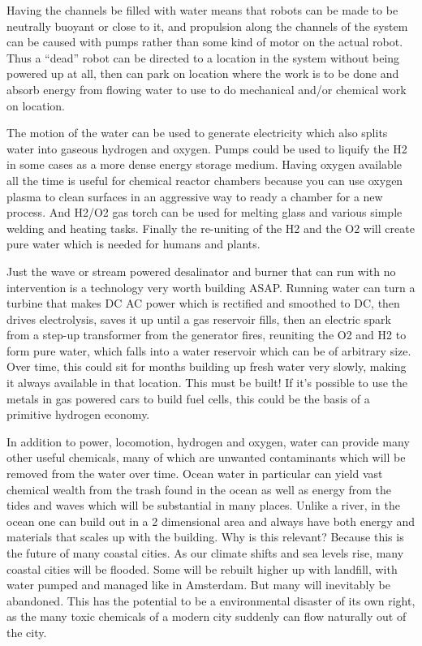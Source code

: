 Having the channels be filled with water means that robots can be made
to be neutrally buoyant or close to it, and propulsion along the
channels of the system can be caused with pumps rather than some kind of
motor on the actual robot. Thus a ``dead'' robot can be directed to a
location in the system without being powered up at all, then can park on
location where the work is to be done and absorb energy from flowing
water to use to do mechanical and/or chemical work on location.

The motion of the water can be used to generate electricity which also
splits water into gaseous hydrogen and oxygen. Pumps could be used to
liquify the H2 in some cases as a more dense energy storage medium.
Having oxygen available all the time is useful for chemical reactor
chambers because you can use oxygen plasma to clean surfaces in an
aggressive way to ready a chamber for a new process. And H2/O2 gas torch
can be used for melting glass and various simple welding and heating
tasks. Finally the re-uniting of the H2 and the O2 will create pure
water which is needed for humans and plants.

Just the wave or stream powered desalinator and burner that can run with
no intervention is a technology very worth building ASAP. Running water
can turn a turbine that makes DC AC power which is rectified and
smoothed to DC, then drives electrolysis, saves it up until a gas
reservoir fills, then an electric spark from a step-up transformer from
the generator fires, reuniting the O2 and H2 to form pure water, which
falls into a water reservoir which can be of arbitrary size. Over time,
this could sit for months building up fresh water very slowly, making it
always available in that location. This must be built! If it's possible
to use the metals in gas powered cars to build fuel cells, this could be
the basis of a primitive hydrogen economy.

In addition to power, locomotion, hydrogen and oxygen, water can provide
many other useful chemicals, many of which are unwanted contaminants
which will be removed from the water over time. Ocean water in
particular can yield vast chemical wealth from the trash found in the
ocean as well as energy from the tides and waves which will be
substantial in many places. Unlike a river, in the ocean one can build
out in a 2 dimensional area and always have both energy and materials
that scales up with the building. Why is this relevant? Because this is
the future of many coastal cities. As our climate shifts and sea levels
rise, many coastal cities will be flooded. Some will be rebuilt higher
up with landfill, with water pumped and managed like in Amsterdam. But
many will inevitably be abandoned. This has the potential to be a
environmental disaster of its own right, as the many toxic chemicals of
a modern city suddenly can flow naturally out of the city.

